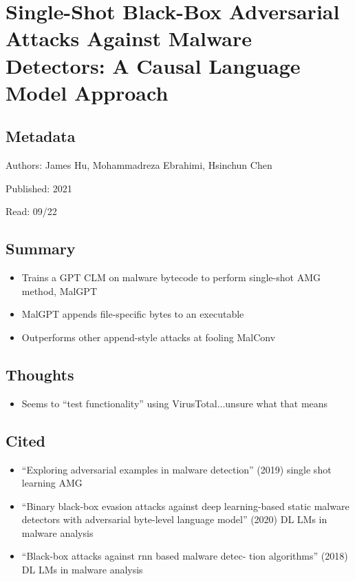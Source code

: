 \documentclass{article}
\begin{document}
\pagebreak


\section*{Single-Shot Black-Box Adversarial Attacks Against Malware Detectors: A Causal Language Model Approach}

\subsection*{Metadata}

\noindent Authors: James Hu, Mohammadreza Ebrahimi, Hsinchun Chen

\noindent Published: 2021

\noindent Read: 09/22

\subsection*{Summary}
\begin{itemize}
	\item Trains a GPT CLM on malware bytecode to perform single-shot AMG method, MalGPT
	\item MalGPT appends file-specific bytes to an executable
	\item Outperforms other append-style attacks at fooling MalConv
\end{itemize}

\subsection*{Thoughts}
\begin{itemize}
	\item Seems to ``test functionality'' using VirusTotal...unsure what that means
\end{itemize}

\subsection*{Cited}
\begin{itemize}
	\item ``Exploring adversarial examples in malware detection'' (2019) single shot learning AMG
	\item ``Binary black-box evasion attacks against deep learning-based static malware detectors with adversarial byte-level language model'' (2020) DL LMs in malware analysis
	\item ``Black-box attacks against rnn based malware detec- tion algorithms'' (2018) DL LMs in malware analysis
\end{itemize}
\end{document}
